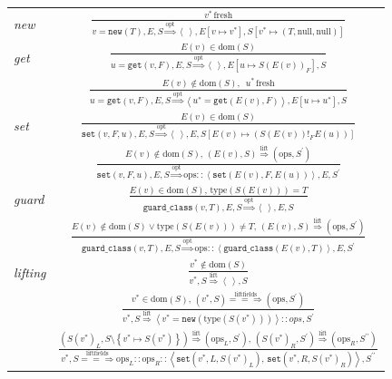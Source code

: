 \documentclass{sigplanconf}
\begin{document}
\begin{figure}
\begin{center}
\begin{tabular}{lc}
\emph{new} & ${\displaystyle \frac{v^{*}\,\mathrm{fresh}}{v=\mathtt{new}(T),E,S\overset{\mathrm{opt}}{\Longrightarrow}\left\langle \,\right\rangle ,E\left[v\mapsto v^{*}\right],S\left[v^{*}\mapsto\left(T,\mathrm{null,null}\right)\right]}}$\tabularnewline[3em]
\emph{get} & ${\displaystyle \frac{E(v)\in\mathrm{dom}(S)}{u=\mathtt{get}(v,F),E,S\overset{\mathrm{opt}}{\Longrightarrow}\left\langle \,\right\rangle ,E\left[u\mapsto S(E(v))_{F}\right],S}}$\tabularnewline[3em]
 & ${\displaystyle \frac{E(v)\notin\mathrm{dom}(S),\,\,\, u^{*}\,\mathrm{fresh}}{u=\mathtt{get}(v,F),E,S\overset{\mathrm{opt}}{\Longrightarrow}\left\langle u^{*}=\mathtt{get}(E(v),F)\right\rangle ,E\left[u\mapsto u^{*}\right],S}}$\tabularnewline[3em]
\emph{set} & ${\displaystyle \frac{E(v)\in\mathrm{dom}(S)}{\mathtt{set}\left(v,F,u\right),E,S\overset{\mathrm{opt}}{\Longrightarrow}\left\langle \,\right\rangle ,E,S\left[E\left(v\right)\mapsto\left(S(E(v))!_{F}E(u)\right)\right]}}$\tabularnewline[3em]
 & ${\displaystyle \frac{E(v)\notin\mathrm{dom}\left(S\right),\,\left(E(v),S\right)\overset{\mathrm{lift}}{\Longrightarrow}\left(\mathrm{ops},S^{\prime}\right)}{\mathtt{set}\left(v,F,u\right),E,S\overset{\mathrm{opt}}{\Longrightarrow}\mathrm{ops}::\left\langle \mathtt{set}\left(E(v),F,E(u)\right)\right\rangle ,E,S^{\prime}}}$\tabularnewline[3em]
\emph{guard} & ${\displaystyle \frac{E(v)\in\mathrm{dom}(S),\,\mathrm{type}(S(E(v)))=T}{\mathtt{guard\_class}(v,T),E,S\overset{\mathrm{opt}}{\Longrightarrow}\left\langle \,\right\rangle ,E,S}}$\tabularnewline[3em]
 & ${\displaystyle \frac{E(v)\notin\mathrm{dom}(S)\vee\mathrm{type}(S(E(v)))\neq T,\,\left(E(v),S\right)\overset{\mathrm{lift}}{\Longrightarrow}\left(\mathrm{ops},S^{\prime}\right)}{\mathtt{guard\_class}(v,T),E,S\overset{\mathrm{opt}}{\Longrightarrow}\mathrm{ops}::\left\langle \mathtt{guard\_class}(E\left(v\right),T)\right\rangle ,E,S^{\prime}}}$\tabularnewline[3em]
\emph{lifting} & ${\displaystyle \frac{v^{*}\notin\mathrm{dom}(S)}{v^{*},S\overset{\mathrm{lift}}{\Longrightarrow}\left\langle \,\right\rangle ,S}}$\tabularnewline[3em]
 & ${\displaystyle \frac{v^{*}\in\mathrm{dom}(S),\,\left(v^{*},S\right)\overset{\mathrm{liftfields}}{=\!=\!\Longrightarrow}\left(\mathrm{ops},S^{\prime}\right)}{v^{*},S\overset{\mathrm{lift}}{\Longrightarrow}\left\langle v^{*}=\mathtt{new}\left(\mathrm{type}\left(S\left(v^{*}\right)\right)\right)\right\rangle ::ops,S^{\prime}}}$\tabularnewline[3em]
 & ${\displaystyle \frac{\left(S\left(v^{*}\right)_{L},S\setminus\left\{ v^{*}\mapsto S\left(v^{*}\right)\right\} \right)\overset{\mathrm{lift}}{\Longrightarrow}\left(\mathrm{ops}_{L},S^{\prime}\right),\,\left(S\left(v^{*}\right)_{R},S^{\prime}\right)\overset{\mathrm{lift}}{\Longrightarrow}\left(\mathrm{ops}_{R},S^{\prime\prime}\right)}{v^{*},S\overset{\mathrm{liftfields}}{=\!=\!\Longrightarrow}\mathrm{ops}_{L}::\mathrm{ops}_{R}::\left\langle \mathtt{set}\left(v^{*},L,S\left(v^{*}\right)_{L}\right),\,\mathtt{set}\left(v^{*},R,S\left(v^{*}\right)_{R}\right)\right\rangle ,S^{\prime\prime}}}$\tabularnewline[3em]
\end{tabular}
\end{center}


\end{figure}
\end{document}
